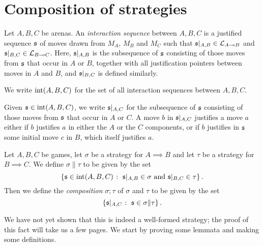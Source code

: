 \section{Composition of strategies}

\begin{definition}
  Let $A,B,C$ be arenas.  
  An \emph{interaction sequence} between $A,B,C$ is a justified sequence $\mathfrak s$ of moves drawn from $M_A$, $M_B$ and $M_C$ such that $\mathfrak s\vert_{A,B}\in \mathcal L_{A\multimap B}$ and $\mathfrak s\vert_{B,C}\in \mathcal L_{B\multimap C}$.  
  Here, $\mathfrak s\vert_{A,B}$ is the subsequence of $\mathfrak s$ consisting of those moves from $\mathfrak s$ that occur in $A$ or $B$, together with all justification pointers between moves in $A$ and $B$, and $\mathfrak s\vert_{B,C}$ is defined similarly.

  We write $\operatorname{int}(A,B,C)$ for the set of all interaction sequences between $A,B,C$.

  Given $\mathfrak s\in\operatorname{int}(A,B,C)$, we write $\mathfrak s\vert_{A,C}$ for the subsequence of $\mathfrak s$ consisting of those moves from $\mathfrak s$ that occur in $A$ or $C$.  
  A move $b$ in $\mathfrak s\vert_{A,C}$ justifies a move $a$ either if $b$ justifies $a$ in either the $A$ or the $C$ components, or if $b$ justifies in $\mathfrak s$ some initial move $c$ in $B$, which itself justifies $a$.
\end{definition}

\begin{definition}
  Let $A,B,C$ be games, let $\sigma$ be a strategy for $A\implies B$ and let $\tau$ be a strategy for $B\implies C$.  
  We define $\sigma\|\tau$ to be given by the set
  \[
    \{\mathfrak s\in\operatorname{int}(A,B,C)\;\colon\; \text{$\mathfrak s\vert_{A,B}\in\sigma$ and $\mathfrak s\vert_{B,C}\in\tau$}\}\,.
    \]
  Then we define the \emph{composition} $\sigma;\tau$ of $\sigma$ and $\tau$ to be given by the set
  \[
    \{\mathfrak s\vert_{A,C}\;\colon\; \mathfrak s\in\sigma\|\tau\}\,.
    \]
\end{definition}

We have not yet shown that this is indeed a well-formed strategy; the proof of this fact will take us a few pages.  
We start by proving some lemmata and making some definitions.

